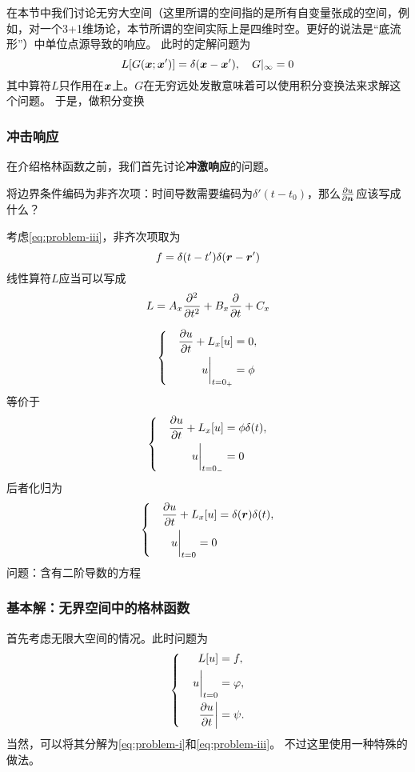 \documentclass[UTF8]{ctexart}
\newenvironment{bigcase}{\left\{ \quad \begin{aligned}}{\end{aligned}\right.}
\begin{document}
在本节中我们讨论无穷大空间（这里所谓的空间指的是所有自变量张成的空间，例如，对一个3+1维场论，本节所谓的空间实际上是四维时空。更好的说法是“底流形”）中单位点源导致的响应。
此时的定解问题为
\begin{equation}
    L[G(\vb*{x};\vb*{x}')] = \delta(\vb*{x} - \vb*{x}'), \quad
    G|_\infty = 0
\end{equation}
其中算符$L$只作用在$\vb*{x}$上。$G$在无穷远处发散意味着可以使用积分变换法来求解这个问题。
于是，做积分变换

\subsubsection{冲击响应}

在介绍格林函数之前，我们首先讨论\textbf{冲激响应}的问题。

将边界条件编码为非齐次项：时间导数需要编码为$\delta'(t-t_0)$，那么$\pdv{u}{\vb*{n}}$应该写成什么？

考虑\eqref{eq:problem-iii}，非齐次项取为
\[
    f = \delta(t-t') \delta(\vb*{r} - \vb*{r}')
\]
线性算符$L$应当可以写成
\[
    L = A_x \pdv[2]{t} + B_x \pdv{t} + C_x
\]

\[
    \begin{bigcase}
        \pdv{u}{t} + L_x[u] &= 0, \\
        \eval{u}_{t=0_+} &= \phi
    \end{bigcase}
\]
等价于
\[
    \begin{bigcase}
        \pdv{u}{t} + L_x[u] &= \phi \delta(t), \\
        \eval{u}_{t=0_-} &= 0
    \end{bigcase}
\]
后者化归为
\[
    \begin{bigcase}
        \pdv{u}{t} + L_x[u] &= \delta(\vb*{r}) \delta(t), \\
        \eval{u}_{t=0} = 0
    \end{bigcase}
\]
问题：含有二阶导数的方程

\subsubsection{基本解：无界空间中的格林函数}

首先考虑无限大空间的情况。此时问题为
\begin{equation}
    \begin{bigcase}
        L[u] &= f, \\
        \eval{u}_{t=0} &= \varphi, \\
        \eval{\pdv{u}{t}} &= \psi.
    \end{bigcase}
    \label{eq:whole-space-definite-problem}
\end{equation}
当然，可以将其分解为\eqref{eq:problem-i}和\eqref{eq:problem-iii}。
不过这里使用一种特殊的做法。
\end{document}
